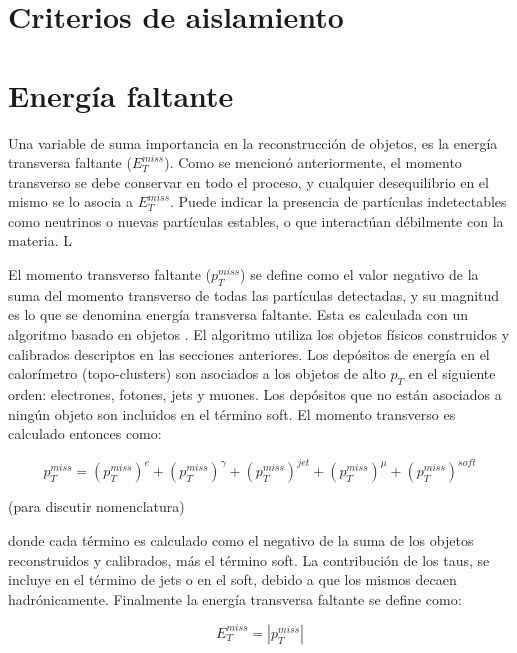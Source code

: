\section{Criterios de aislamiento}





\section{Energía faltante}

Una variable de suma importancia en la reconstrucción de objetos, es la energía transversa faltante ($E_{T}^{miss}$). Como se mencionó anteriormente, el momento transverso se debe conservar en todo el proceso, y cualquier desequilibrio en el mismo se lo asocia a $E_{T}^{miss}$. Puede indicar la presencia de partículas indetectables como neutrinos o nuevas partículas estables, o que interactúan débilmente con la materia. L

El momento transverso faltante ($p_{T}^{miss}$) se define como el valor negativo de la suma del momento transverso de todas las partículas detectadas, y su magnitud es lo que se denomina energía transversa faltante. Esta es calculada con un algoritmo basado en objetos \cite{Khoo:2012749}. El algoritmo utiliza los objetos físicos construidos y calibrados descriptos en las secciones anteriores. Los depósitos de energía en el calorímetro (topo-clusters) son asociados a los objetos de alto $p_{T}$ en el siguiente orden: electrones, fotones, jets y muones. Los depósitos que no están asociados a ningún objeto son incluidos en el término soft. El momento transverso es calculado entonces como:

\begin{equation}
p_{T}^{miss}=\left(p_{T}^{miss}\right)^{e} + \left(p_{T}^{miss}\right)^{\gamma} + \left(p_{T}^{miss}\right)^{jet} +\left(p_{T}^{miss}\right)^{\mu} + \left(p_{T}^{miss}\right)^{soft}
\end{equation}

(para discutir nomenclatura)

donde cada término es calculado como el negativo de la suma de los objetos reconstruidos y calibrados, más el término soft. La contribución de los taus, se incluye en el término de jets o en el soft, debido a que los mismos decaen hadrónicamente. Finalmente la energía transversa faltante se define como:

\begin{equation}
E_{T}^{miss}=|p_{T}^{miss}|
\end{equation}

\normalsize
